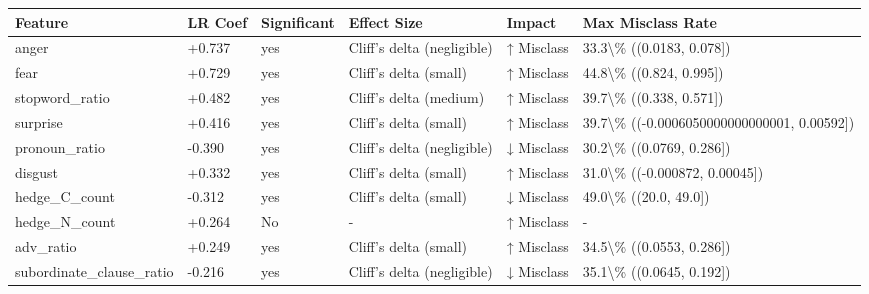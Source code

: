 \begin{tabular}{llllll}
\toprule
Feature & LR Coef & Significant & Effect Size & Impact & Max Misclass Rate \\
\midrule
anger & +0.737 & yes & Cliff's delta (negligible) & ↑ Misclass & 33.3\textbackslash \% ((0.0183, 0.078]) \\
fear & +0.729 & yes & Cliff's delta (small) & ↑ Misclass & 44.8\textbackslash \% ((0.824, 0.995]) \\
stopword\_ratio & +0.482 & yes & Cliff's delta (medium) & ↑ Misclass & 39.7\textbackslash \% ((0.338, 0.571]) \\
surprise & +0.416 & yes & Cliff's delta (small) & ↑ Misclass & 39.7\textbackslash \% ((-0.0006050000000000001, 0.00592]) \\
pronoun\_ratio & -0.390 & yes & Cliff's delta (negligible) & ↓ Misclass & 30.2\textbackslash \% ((0.0769, 0.286]) \\
disgust & +0.332 & yes & Cliff's delta (small) & ↑ Misclass & 31.0\textbackslash \% ((-0.000872, 0.00045]) \\
hedge\_C\_count & -0.312 & yes & Cliff's delta (small) & ↓ Misclass & 49.0\textbackslash \% ((20.0, 49.0]) \\
hedge\_N\_count & +0.264 & No & - & ↑ Misclass & - \\
adv\_ratio & +0.249 & yes & Cliff's delta (small) & ↑ Misclass & 34.5\textbackslash \% ((0.0553, 0.286]) \\
subordinate\_clause\_ratio & -0.216 & yes & Cliff's delta (negligible) & ↓ Misclass & 35.1\textbackslash \% ((0.0645, 0.192]) \\
\bottomrule
\end{tabular}
